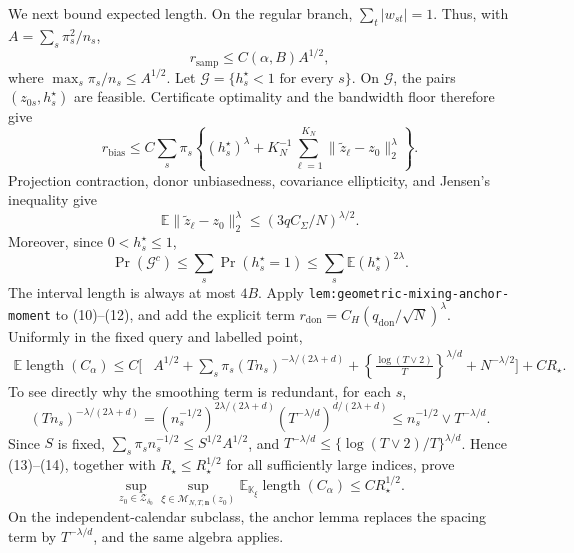 We next bound expected length.  On the regular branch,
\(\sum_t|w_{st}|=1\).  Thus, with \(A=\sum_s\pi_s^2/n_s\),
\[
 r_{\mathrm{samp}}\le C(\alpha,B)A^{1/2},                  \tag{9}
\]
where \(\max_s\pi_s/n_s\le A^{1/2}\).  Let
\(\mathcal G=\{h_s^\star<1\text{ for every }s\}\).  On \(\mathcal G\), the pairs \((z_{0s},h_s^\star)\) are feasible.  Certificate optimality and the bandwidth floor therefore give
\[
 r_{\mathrm{bias}}
 \le C\sum_s\pi_s\left\{
 (h_s^\star)^\lambda+K_N^{-1}\sum_{\ell=1}^{K_N}
 \|\widetilde z_\ell-z_0\|_2^\lambda\right\}.            \tag{10}
\]
Projection contraction, donor unbiasedness, covariance ellipticity, and Jensen's inequality give
\[
 \mathbb E\|\widetilde z_\ell-z_0\|_2^\lambda
 \le\left(3qC_\Sigma/N\right)^{\lambda/2}.                 \tag{11}
\]
Moreover, since \(0<h_s^\star\le1\),
\[
 \Pr(\mathcal G^c)
 \le\sum_s\Pr(h_s^\star=1)
 \le\sum_s\mathbb E(h_s^\star)^{2\lambda}.               \tag{12}
\]
The interval length is always at most \(4B\).  Apply
\texttt{lem:geometric-mixing-anchor-moment} to (10)--(12), and add the explicit term
\(r_{\mathrm{don}}=C_H(q_{\mathrm{don}}/\sqrt N)^\lambda\).  Uniformly in the fixed query and labelled point,
\[
\begin{aligned}
 \mathbb E\operatorname{length}(C_\alpha)
 \le C\bigg[&A^{1/2}+
 \sum_s\pi_s(Tn_s)^{-\lambda/(2\lambda+d)}+
 \left\{\frac{\log(T\vee2)}{T}\right\}^{\lambda/d}
 +N^{-\lambda/2}\bigg]+CR_\star.
\end{aligned}                                               \tag{13}
\]
To see directly why the smoothing term is redundant, for each \(s\),
\[
 (Tn_s)^{-\lambda/(2\lambda+d)}
 =(n_s^{-1/2})^{2\lambda/(2\lambda+d)}
   (T^{-\lambda/d})^{d/(2\lambda+d)}
 \le n_s^{-1/2}\vee T^{-\lambda/d}.                       \tag{14}
\]
Since \(S\) is fixed,
\(\sum_s\pi_sn_s^{-1/2}\le S^{1/2}A^{1/2}\), and
\(T^{-\lambda/d}\le\{\log(T\vee2)/T\}^{\lambda/d}\).  Hence (13)--(14), together with \(R_\star\le R_\star^{1/2}\) for all sufficiently large indices, prove
\[
 \sup_{z_0\in\mathcal Z_{\delta_0}}
 \sup_{\xi\in\mathcal M_{N,T,\mathbf n}(z_0)}
 \mathbb E_{\mathbb K_\xi}\operatorname{length}(C_\alpha)
 \le CR_\star^{1/2}.                                       \tag{15}
\]
On the independent-calendar subclass, the anchor lemma replaces the spacing term by \(T^{-\lambda/d}\), and the same algebra applies.

